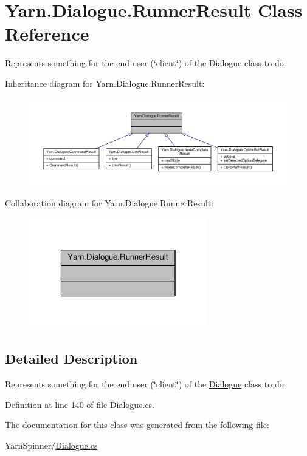 \hypertarget{a00158}{\section{Yarn.\-Dialogue.\-Runner\-Result Class Reference}
\label{a00158}
}


Represents something for the end user (\char`\"{}client\char`\"{}) of the \hyperlink{a00094}{Dialogue} class to do.  




Inheritance diagram for Yarn.\-Dialogue.\-Runner\-Result\-:
\nopagebreak
\begin{figure}[H]
\begin{center}
\leavevmode
\includegraphics[width=350pt]{a00634}
\end{center}
\end{figure}


Collaboration diagram for Yarn.\-Dialogue.\-Runner\-Result\-:
\nopagebreak
\begin{figure}[H]
\begin{center}
\leavevmode
\includegraphics[width=220pt]{a00635}
\end{center}
\end{figure}


\subsection{Detailed Description}
Represents something for the end user (\char`\"{}client\char`\"{}) of the \hyperlink{a00094}{Dialogue} class to do. 

Definition at line 140 of file Dialogue.\-cs.



The documentation for this class was generated from the following file\-:\begin{DoxyCompactItemize}
\item 
Yarn\-Spinner/\hyperlink{a00308}{Dialogue.\-cs}\end{DoxyCompactItemize}
